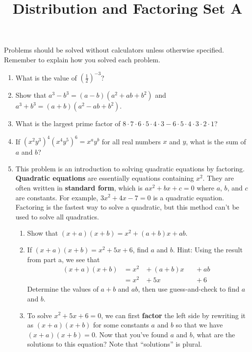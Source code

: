 \documentclass{article}
\title{Distribution and Factoring Set A}
\author{}
\date{}
\begin{document}
    \maketitle
    \noindent Problems should be solved without calculators unless otherwise specified. Remember to explain how you solved each problem.
    \begin{enumerate}
        \item What is the value of $\left(\frac{1}{2}\right)^{-3}$?
        \vspace{3cm}
        \item Show that $a^3 - b^3 = (a - b)(a^2 + ab + b^2)$ and $a^3 + b^3 = (a + b)(a^2 - ab + b^2)$.
        \vspace{3cm}
        \item What is the largest prime factor of $8 \cdot 7 \cdot 6 \cdot 5 \cdot 4 \cdot 3 - 6 \cdot 5 \cdot 4 \cdot 3 \cdot 2 \cdot 1$?
        \vspace{3cm}
        \item If $(x^2 y^3)^4 (x^4 y^5)^6 = x^a y^b$ for all real numbers $x$ and $y$, what is the sum of $a$ and $b$?
        \vspace{3cm}
        \item This problem is an introduction to solving quadratic equations by factoring. \textbf{Quadratic equations} are essentially equations containing $x^2$. They are often written in \textbf{standard form}, which is $ax^2 + bx + c = 0$ where $a$, $b$, and $c$ are constants. For example, $3x^2 + 4x - 7 = 0$ is a quadratic equation. Factoring is the fastest way to solve a quadratic, but this method can't be used to solve all quadratics.
        \begin{enumerate}
            \item Show that $(x + a)(x + b) = x^2 + (a + b)x + ab$.
            \vspace{3cm}
            \item If $(x + a)(x + b) = x^2 + 5x + 6$, find $a$ and $b$. Hint: Using the result from part a, we see that
            \[\begin{alignedat}{3}
                (x + a)(x + b) & = x^2 &{} + (a + b)x &&{} + ab &\\
                & = x^2 &{} + 5x &&{} + 6 &
            \end{alignedat}\]
            Determine the values of $a + b$ and $ab$, then use guess-and-check to find $a$ and $b$.
            \vspace{3cm}
            \item To solve $x^2 + 5x + 6 = 0$, we can first \textbf{factor} the left side by rewriting it as $(x + a)(x + b)$ for some constants $a$ and $b$ so that we have $(x + a)(x + b) = 0$. Now that you've found $a$ and $b$, what are the solutions to this equation? Note that ``solutions'' is plural.
            \vspace{3cm}
        \end{enumerate}
    \end{enumerate}
\end{document}
